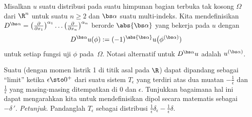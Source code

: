 \begin{defn} Misalkan $u$ suatu distribusi pada suatu himpunan bagian terbuka tak kosong $\Omega$ dari $\R^n$ untuk suatu $n \ge 2$ dan $\bs\alpha$
suatu multi-indeks. Kita mendefinisikan
 $D^{\bs\alpha} = \bigl(\frac{\partial}{\partial x_1}\bigr)^{\alpha_1} \dots
\bigl(\frac{\partial}{\partial x_n}\bigr)^{\alpha_n}$ berorde $\abs{\bs\alpha}$ yang bekerja pada $u$ dengan
   \[ D^{\bs\alpha}u(\phi) := (-1)^{\abs{\bs\alpha}}u\bigl(\phi^{(\bs\alpha)}) \]
untuk setiap fungsi uji $\phi$ pada~$\Omega$.
Notasi alternatif untuk $D^{\bs\alpha}u$ adalah $u^{(\bs\alpha)}$.
\end{defn}

\begin{exer} Suatu  (dengan momen listrik 1 di titik asal pada $\R$) dapat dipandang sebagai ``limit'' ketika $\epsilon \sto 0^+$
dari suatu sistem $T_\epsilon$ yang terdiri atas dua muatan $-\frac1\epsilon$ dan $\frac1\epsilon$ yang masing-masing ditempatkan di $0$ dan $\epsilon$. Tunjukkan
bagaimana hal ini dapat mengarahkan kita untuk mendefinisikan dipol secara matematis sebagai $-\delta\,'$. \emph{Petunjuk.} Pandanglah $T_\epsilon$ sebagai
distribusi $\frac1\epsilon \delta_\epsilon - \frac1\epsilon \delta$.
\end{exer}
 
